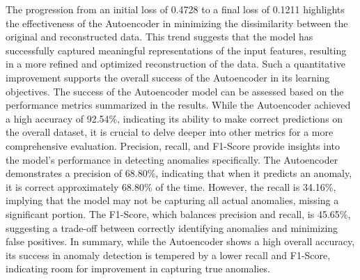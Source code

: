 \documentclass[10pt,twocolumn,letterpaper]{article}
\begin{document}
The progression from an initial loss of 0.4728 to a final loss of 0.1211 highlights the effectiveness of the Autoencoder in minimizing the dissimilarity between the 
original and reconstructed data. This trend suggests that the model has successfully captured meaningful representations of the input features, resulting in a more 
refined and optimized reconstruction of the data. Such a quantitative improvement supports the overall success of the Autoencoder in its learning objectives.
The success of the Autoencoder model can be assessed based on the performance metrics summarized in the results. While the Autoencoder achieved a high accuracy 
of 92.54\%, indicating its ability to make correct predictions on the overall dataset, it is crucial to delve deeper into other metrics for a more comprehensive evaluation.
Precision, recall, and F1-Score provide insights into the model's performance in detecting anomalies specifically. 
The Autoencoder demonstrates a precision of 68.80\%, indicating that when it predicts an anomaly, it is correct approximately 68.80\% of the time. 
However, the recall is 34.16\%, implying that the model may not be capturing all actual anomalies, missing a significant portion.
The F1-Score, which balances precision and recall, is 45.65\%, suggesting a trade-off between correctly identifying anomalies and minimizing false positives.
In summary, while the Autoencoder shows a high overall accuracy, its success in anomaly detection is tempered by a lower recall and F1-Score, indicating room for 
improvement in capturing true anomalies.
\end{document}
